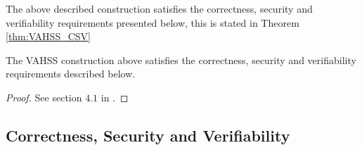 The above described construction satisfies the correctness, security and verifiability requirements presented below, this is stated in Theorem \ref{thm:VAHSS_CSV} 
\\
\begin{thm}
\label{thm:VAHSS_CSV}
The VAHSS construction above satisfies the correctness, security and verifiability requirements described below.
\end{thm}
\begin{proof}
See section $4.1$ in \cite{VAHSS}.
\end{proof}


\subsection*{Correctness, Security and Verifiability}

